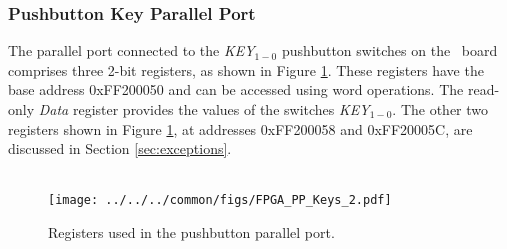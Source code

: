 \subsubsection{Pushbutton Key Parallel Port}

The parallel port connected to the {\it KEY}$_{1-0}$ 
pushbutton switches on the \DEBoard~board comprises three 2-bit
registers, as shown in Figure \ref{fig:pushbutton_port}. These registers have 
the base address {\sf 0xFF200050} and can be accessed using word operations. 
The read-only {\it Data} register provides the values of the switches {\it KEY}$_{1-0}$. 
The other two registers shown in Figure \ref{fig:pushbutton_port}, at addresses
{\sf 0xFF200058} and {\sf 0xFF20005C}, are discussed in Section \ref{sec:exceptions}.
~\\
~\\
\begin{figure}[h!]
   \begin{center}
       \texttt{[image: ../../../common/figs/FPGA\_PP\_Keys\_2.pdf]}
   \end{center}
   \caption{Registers used in the pushbutton parallel port.}
	\label{fig:pushbutton_port}
\end{figure}
